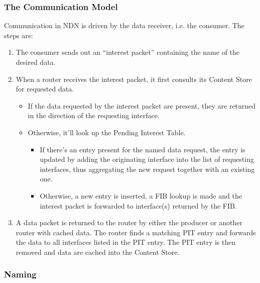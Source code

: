             \subsubsection{The Communication Model}

                Communication in NDN is driven by the data receiver, i.e. the consumer. The steps are:

                \begin{enumerate}
                    \item The consumer sends out an ``interest packet'' containing the name of the desired data.
                    \item When a router receives the interest packet, it first consults its Content Store for requested data.
                        \begin{itemize}
                            \item If the data requested by the interest packet are present, they are returned in the direction of the requesting interface.
                            \item Otherwise, it'll look up the Pending Interest Table.
                            \begin{itemize}
                                \item If there's an entry present for the named data request, the entry is updated by adding the originating interface into the list of requesting interfaces, thus aggregating the new request together with an existing one.
                                \item Otherwise, a new entry is inserted, a FIB lookup is made and the interest packet is forwarded to interface(s) returned by the FIB.
                            \end{itemize}
                        \end{itemize}
                    \item A data packet is returned to the router by either the producer or another router with cached data. The router finds a matching PIT entry and forwards the data to all interfaces listed in the PIT entry. The PIT entry is then removed and data are cached into the Content Store.
                \end{enumerate}

            \subsubsection{Naming}

